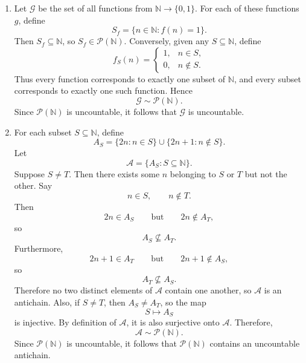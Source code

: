 \documentclass[12pt]{article}
\begin{document}
\begin{enumerate}
          Since $\mathbb{N} \times \mathbb{N}$ is countable, it follows that
          $\mathcal{F}$ is countable.
    \item [(b)] Let $\mathcal{G}$ be the set of all functions from $\mathbb{N} \to \{0, 1\}$.
          For each of these functions $g$, define
          \[
              S_f = \{n \in \mathbb{N} : f(n) = 1\}.
          \]
          Then \(S_f\subseteq\mathbb N\), so \(S_f\in\mathcal P(\mathbb N)\).
          Conversely, given any \(S\subseteq\mathbb N\), define
          \[
              f_S(n)=
              \begin{cases}
                  1, & n\in S,    \\
                  0, & n\notin S.
              \end{cases}
          \]
          Thus every function corresponds to exactly one subset of \(\mathbb N\), and every subset corresponds to exactly one such function. Hence
          \[
              \mathcal G\sim\mathcal P(\mathbb N).
          \]
          Since \(\mathcal P(\mathbb N)\) is uncountable,
          it follows that $\mathcal{G}$ is uncountable.
    \item [(c)]
          For each subset \(S\subseteq\mathbb N\), define
          \[
              A_S = \{2n:n\in S\}  \cup  \{2n+1:n\notin S\}.
          \]
          Let
          \[
              \mathcal A=\{A_S:S\subseteq\mathbb N\}.
          \]
          Suppose \(S\neq T\).
          Then there exists some \(n\) belonging to $S$ or $T$ but not the other.
          Say
          \[
              n\in S,\qquad n\notin T.
          \]
          Then
          \[
              2n\in A_S
              \qquad\text{but}\qquad
              2n\notin A_T,
          \]
          so
          \[
              A_S\not\subseteq A_T.
          \]
          Furthermore,
          \[
              2n+1\in A_T
              \qquad\text{but}\qquad
              2n+1\notin A_S,
          \]
          so
          \[
              A_T\not\subseteq A_S.
          \]
          Therefore no two distinct elements of \(\mathcal A\) contain one another,
          so \(\mathcal A\) is an antichain.
          Also, if $S \neq T$, then $A_S \neq A_T$, so the map
          \[
              S \mapsto A_S
          \]
          is injective.
          By definition of $\mathcal A$, it is also surjective onto $\mathcal A$.
          Therefore,
          \[
              \mathcal A \sim \mathcal P(\mathbb N).
          \]
          Since \(\mathcal P(\mathbb N)\) is uncountable,
          it follows that $\mathcal P(\mathbb N)$ contains an uncountable antichain.
\end{enumerate}
\end{document}
